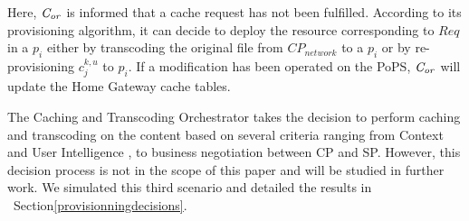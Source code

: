 Here, $\mathit{C_{or}}$ is informed that a cache request has not been fulfilled. According to its provisioning algorithm, it can decide to deploy the resource corresponding to $\mathit{Req}$ in a $p_{i}$ either by transcoding the original file from \(\mathit{CP}_{\mathit{network}}\) to a $p_{i}$ or by re-provisioning $c^{k,u}_{j}$ to $p_{i}$.
If a modification has been operated on the PoPS, $\mathit{C_{or}}$ will update the Home Gateway cache tables.

The Caching and Transcoding Orchestrator takes the decision to perform caching and transcoding on the content based on several criteria ranging from Context and User Intelligence \cite{wang_cpcdn:_2015}, to business negotiation between CP and SP.
However, this decision process is not in the scope of this paper and will be studied in further work. 
We simulated this third scenario and detailed the results in ~Section\ref{provisionningdecisions}.


